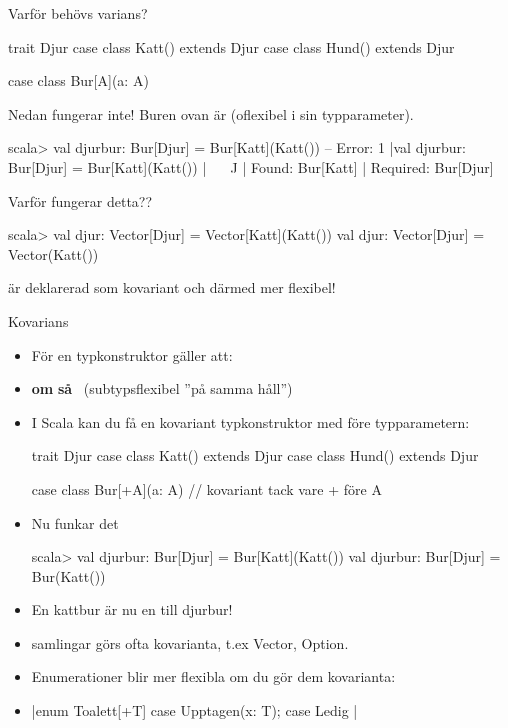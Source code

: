 \begin{Slide}{Varför behövs varians?}\SlideFontSmall
\begin{Code}
trait Djur
case class Katt() extends Djur
case class Hund() extends Djur

case class Bur[A](a: A)
\end{Code}
\pause
Nedan fungerar inte! Buren ovan är  (oflexibel i sin typparameter).
\begin{REPL}
scala> val djurbur: Bur[Djur] = Bur[Katt](Katt())
-- Error:
1 |val djurbur: Bur[Djur] = Bur[Katt](Katt())
  |                   ^^^^^^^^^^^^^^^^^
  |                   Found:    Bur[Katt]
  |                   Required: Bur[Djur]
\end{REPL}
\pause
Varför fungerar detta??
\begin{REPL}
scala> val djur: Vector[Djur] = Vector[Katt](Katt())
val djur: Vector[Djur] = Vector(Katt())
\end{REPL}
\pause {} är deklarerad som kovariant och därmed mer flexibel!
\end{Slide}


\begin{Slide}{Kovarians }
\begin{itemize}\SlideFontSmall
\item För en  typkonstruktor  gäller att: 
\item[] \textbf{om} \code{ T <: U } \textbf{så} ~(subtypsflexibel ''på samma håll'')
\item I Scala kan du få en kovariant typkonstruktor med \code{+} före typparametern:
\begin{Code}
trait Djur
case class Katt() extends Djur
case class Hund() extends Djur

case class Bur[+A](a: A)  // kovariant tack vare + före A
\end{Code}
\pause
\item Nu funkar det \code{:)}
\begin{REPL}
scala> val djurbur: Bur[Djur] = Bur[Katt](Katt())
val djurbur: Bur[Djur] = Bur(Katt())
\end{REPL}
\item En kattbur är nu en  till djurbur!
\pause
\item {} samlingar görs ofta kovarianta, t.ex Vector, Option.
\item Enumerationer blir mer flexibla om du gör dem kovarianta:
\item[] \code|enum Toalett[+T] { case Upptagen(x: T); case Ledig }|
\end{itemize}

\end{Slide}


